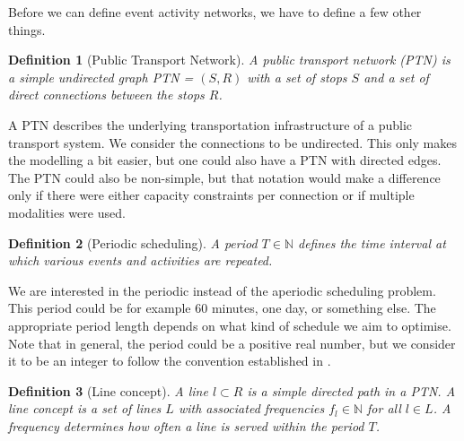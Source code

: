 \documentclass[english, 12pt, a4paper, sci, utf8, a-2b, online]{aaltothesis}
\newtheorem{definition}{Definition}
\newcommand{\N}{\mathbb{N}}
\newcommand{\period}{T}
\begin{document}



Before we can define event activity networks, we have to define a few other things.
\begin{definition}[Public Transport Network]\label{def:ptn}
    A \textit{public transport network} (PTN) is a simple undirected graph PTN = $(S, R)$ with a set of stops $S$ and a set of direct connections between the stops $R$. 
\end{definition}

A PTN describes the underlying transportation infrastructure of a public transport system. We consider the connections to be undirected. This only makes the modelling a bit easier, but one could also have a PTN with directed edges. The PTN could also be non-simple, but that notation would make a difference only if there were either capacity constraints per connection or if multiple modalities were used.

\begin{definition}[Periodic scheduling]  %
    A period $\period \in \N$ defines the time interval at which various events and activities are repeated.
\end{definition}

We are interested in the periodic instead of the aperiodic scheduling problem. This period could be for example 60 minutes, one day, or something else. The appropriate period length depends on what kind of schedule we aim to optimise. Note that in general, the period could be a positive real number, but we consider it to be an integer to follow the convention established in \cite{schiewe2020periodic}.

\begin{definition}[Line concept]
    A \textit{line} $l \subset R$ is a simple directed path in a PTN. A \textit{line concept} is a set of lines $L$ with associated frequencies $f_l \in \N$ for all $l \in L$. A frequency determines how often a line is served within the period $T$.
\end{definition}

\end{document}
